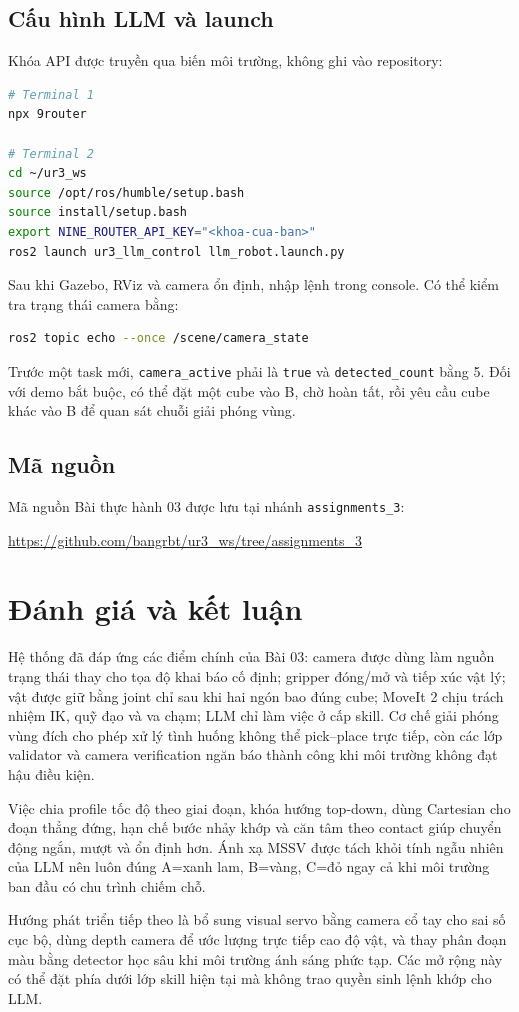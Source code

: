 \documentclass[a4paper,12pt]{article}
\newcommand{\code}[1]{\texttt{#1}}
\begin{document}
\subsection{Cấu hình LLM và launch}
Khóa API được truyền qua biến môi trường, không ghi vào repository:
\begin{lstlisting}[language=bash,caption={Khởi động 9Router và hệ thống robot}]
# Terminal 1
npx 9router

# Terminal 2
cd ~/ur3_ws
source /opt/ros/humble/setup.bash
source install/setup.bash
export NINE_ROUTER_API_KEY="<khoa-cua-ban>"
ros2 launch ur3_llm_control llm_robot.launch.py
\end{lstlisting}

Sau khi Gazebo, RViz và camera ổn định, nhập lệnh trong console. Có thể kiểm tra
trạng thái camera bằng:
\begin{lstlisting}[language=bash,caption={Kiểm tra scene state do camera công bố}]
ros2 topic echo --once /scene/camera_state
\end{lstlisting}
Trước một task mới, \code{camera\_active} phải là \code{true} và
\code{detected\_count} bằng 5. Đối với demo bắt buộc, có thể đặt một cube vào B,
chờ hoàn tất, rồi yêu cầu cube khác vào B để quan sát chuỗi giải phóng vùng.

\subsection{Mã nguồn}
Mã nguồn Bài thực hành 03 được lưu tại nhánh \code{assignments\_3}:
\begin{center}
\url{https://github.com/bangrbt/ur3_ws/tree/assignments_3}
\end{center}

\section{Đánh giá và kết luận}

Hệ thống đã đáp ứng các điểm chính của Bài 03: camera được dùng làm nguồn trạng
thái thay cho tọa độ khai báo cố định; gripper đóng/mở và tiếp xúc vật lý; vật
được giữ bằng joint chỉ sau khi hai ngón bao đúng cube; MoveIt 2 chịu trách nhiệm
IK, quỹ đạo và va chạm; LLM chỉ làm việc ở cấp skill. Cơ chế giải phóng vùng
đích cho phép xử lý tình huống không thể pick--place trực tiếp, còn các lớp
validator và camera verification ngăn báo thành công khi môi trường không đạt
hậu điều kiện.

Việc chia profile tốc độ theo giai đoạn, khóa hướng top-down, dùng Cartesian cho
đoạn thẳng đứng, hạn chế bước nhảy khớp và căn tâm theo contact giúp chuyển động
ngắn, mượt và ổn định hơn. Ánh xạ MSSV được tách khỏi tính ngẫu nhiên của LLM nên
luôn đúng A=xanh lam, B=vàng, C=đỏ ngay cả khi môi trường ban đầu có chu trình
chiếm chỗ.

Hướng phát triển tiếp theo là bổ sung visual servo bằng camera cổ tay cho sai số
cục bộ, dùng depth camera để ước lượng trực tiếp cao độ vật, và thay phân đoạn
màu bằng detector học sâu khi môi trường ánh sáng phức tạp. Các mở rộng này có
thể đặt phía dưới lớp skill hiện tại mà không trao quyền sinh lệnh khớp cho LLM.
\end{document}

